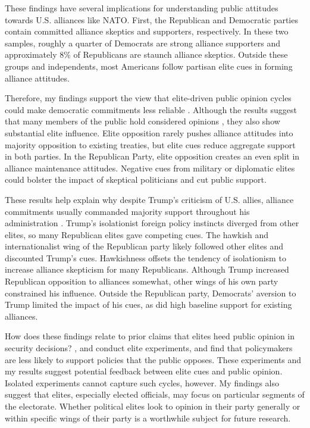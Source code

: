 \documentclass[12pt]{article}
\begin{document}
These findings have several implications for understanding public attitudes towards U.S. alliances like NATO. 
First, the Republican and Democratic parties contain committed alliance skeptics and supporters, respectively.
In these two samples, roughly a quarter of Democrats are strong alliance supporters and approximately 8\% of Republicans are staunch alliance skeptics.
Outside these groups and independents, most Americans follow partisan elite cues in forming alliance attitudes. 


Therefore, my findings support the view that elite-driven public opinion cycles could make democratic commitments less reliable \citep{GartzkeGleditsch2004}. 
Although the results suggest that many members of the public hold considered opinions \citep{PageShapiro1992}, they also show substantial elite influence. 
Elite opposition rarely pushes alliance attitudes into majority opposition to existing treaties, but elite cues reduce aggregate support in both parties.
In the Republican Party, elite opposition creates an even split in alliance maintenance attitudes. 
Negative cues from military or diplomatic elites could bolster the impact of skeptical politicians and cut public support. 


These results help explain why despite Trump's criticism of U.S. allies, alliance commitments usually commanded majority support throughout his administration \citep{PewNATO2020}. 
Trump's isolationist foreign policy instincts diverged from other elites, so many Republican elites gave competing cues.
The hawkish and internationalist wing of the Republican party likely followed other elites and discounted Trump's cues. 
Hawkishness offsets the tendency of isolationism to increase alliance skepticism for many Republicans.
Although Trump increased Republican opposition to alliances somewhat, other wings of his own party constrained his influence.
Outside the Republican party, Democrats' aversion to Trump limited the impact of his cues, as did high baseline support for existing alliances. 


How does these findings relate to prior claims that elites heed public opinion in security decisions?
\citet{Tomzetal2020}, \citet{LinGreenberg2021} and \citet{ChuRechhia2021} conduct elite experiments, and find that policymakers are less likely to support policies that the public opposes.
These experiments and my results suggest potential feedback between elite cues and public opinion.
Isolated experiments cannot capture such cycles, however. 
My findings also suggest that elites, especially elected officials, may focus on particular segments of the electorate. 
Whether political elites look to opinion in their party generally or within specific wings of their party is a worthwhile subject for future research.
\end{document}
